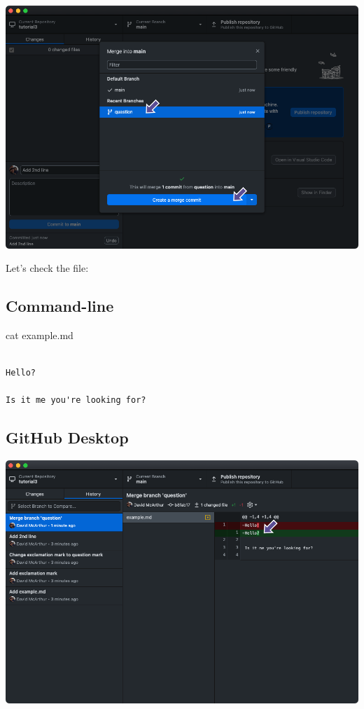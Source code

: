 \documentclass[
  letterpaper,
  DIV=11,
  numbers=noendperiod]{scrartcl}
\newenvironment{Shaded}{\begin{snugshade}}{\end{snugshade}}
\newcommand{\NormalTok}[1]{\textcolor[rgb]{0.00,0.23,0.31}{#1}}
\begin{document}
\includegraphics{images/image44.png}

Let's check the file:

\subsection{Command-line}

\begin{Shaded}
\begin{Highlighting}[]
\NormalTok{cat example.md}
\end{Highlighting}
\end{Shaded}

\begin{verbatim}

Hello?

Is it me you're looking for?
\end{verbatim}

\subsection{GitHub Desktop}

\includegraphics{images/image45.png}
\end{document}
